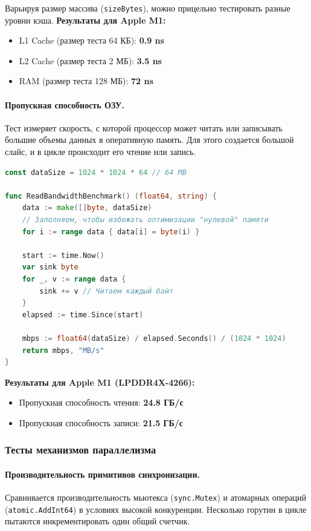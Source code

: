 Варьируя размер массива (\texttt{sizeBytes}), можно прицельно тестировать разные уровни кэша.
\textbf{Результаты для Apple M1:}
\begin{itemize}
    \item L1 Cache (размер теста 64 КБ): \textbf{0.9 ns}
    \item L2 Cache (размер теста 2 МБ): \textbf{3.5 ns}
    \item RAM (размер теста 128 МБ): \textbf{72 ns}
\end{itemize}

\paragraph{Пропускная способность ОЗУ.} Тест измеряет скорость, с которой процессор может читать или записывать большие объемы данных в оперативную память. Для этого создается большой слайс, и в цикле происходит его чтение или запись. 

\begin{lstlisting}[language=Go, caption={Реализация теста пропускной способности чтения}]
const dataSize = 1024 * 1024 * 64 // 64 MB

func ReadBandwidthBenchmark() (float64, string) {
	data := make([]byte, dataSize)
	// Заполняем, чтобы избежать оптимизации "нулевой" памяти
	for i := range data { data[i] = byte(i) }

	start := time.Now()
	var sink byte
	for _, v := range data {
		sink += v // Читаем каждый байт
	}
	elapsed := time.Since(start)
	
	mbps := float64(dataSize) / elapsed.Seconds() / (1024 * 1024)
	return mbps, "MB/s"
}
\end{lstlisting}

\textbf{Результаты для Apple M1 (LPDDR4X-4266):}
\begin{itemize}
    \item Пропускная способность чтения: \textbf{24.8 ГБ/с}
    \item Пропускная способность записи: \textbf{21.5 ГБ/с}
\end{itemize}

\subsubsection{Тесты механизмов параллелизма}

\paragraph{Производительность примитивов синхронизации.} Сравнивается производительность мьютекса (\texttt{sync.Mutex}) и атомарных операций (\texttt{atomic.AddInt64}) в условиях высокой конкуренции. Несколько горутин в цикле пытаются инкрементировать один общий счетчик.

